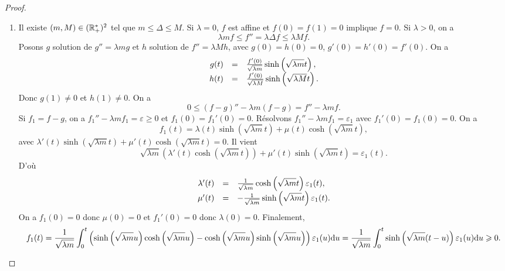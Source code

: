 \documentclass[12pt]{article}
\begin{document}
\begin{proof}
	\phantom{}
	\begin{enumerate}
		\item Il existe $(m,M)\in(\mathbb{R}_{+}^{*})^{2}$ tel que $m\leqslant \Delta\leqslant M$. Si $\lambda=0$, $f$ est affine et $f(0)=f(1)=0$ implique $f=0$. Si $\lambda>0$, on a 
		\begin{equation}
			\lambda mf\leqslant f''=\lambda\Delta f\leqslant \lambda Mf.
		\end{equation}
		Posons $g$ solution de $g''=\lambda mg$ et $h$ solution de $f''=\lambda Mh$, avec $g(0)=h(0)=0$, $g'(0)=h'(0)=f'(0)$. On a 
		\begin{equation}
			\begin{array}[]{rcl}
				g(t) &=& \frac{f'(0)}{\sqrt{\lambda m}}\sinh\left(\sqrt{\lambda m}t\right),\\
				h(t) &=& \frac{f'(0)}{\sqrt{\lambda M}}\sinh\left(\sqrt{\lambda M}t\right).
			\end{array}
		\end{equation}
		Donc $g(1)\neq0$ et $h(1)\neq0$. On a 
		\begin{equation}
			0\leqslant (f-g)''-\lambda m(f-g)=f''-\lambda mf.
		\end{equation}
		Si $f_1=f-g$, on a $f_1''-\lambda m f_1=\varepsilon\geqslant0$ et $f_1(0)=f_1'(0)=0$. Résolvons $f_1''-\lambda mf_1=\varepsilon_{1}$ avec $f_1'(0)=f_1(0)=0$. On a 
		\begin{equation}
			f_1(t) = \lambda(t)\sinh\left(\sqrt{\lambda m}t\right)+\mu(t)\cosh\left(\sqrt{\lambda m}t\right),
		\end{equation}
		avec $\lambda'(t)\sinh\left(\sqrt{\lambda m}t\right)+\mu'(t)\cosh\left(\sqrt{\lambda m}t\right)=0$. Il vient 
		\begin{equation}
			\sqrt{\lambda m}\left(\lambda'(t)\cosh\left(\sqrt{\lambda m}t\right)\right)+\mu'(t)\sinh\left(\sqrt{\lambda m}t\right)=\varepsilon_{1}(t).
		\end{equation}
		D'où 
		\begin{equation}
			\begin{array}[]{rcl}
				\lambda'(t) &=& \frac{1}{\sqrt{\lambda m}}\cosh\left(\sqrt{\lambda m}t\right)\varepsilon_{1}(t),\\
				\mu'(t) &=& -\frac{1}{\sqrt{\lambda m}}\sinh\left(\sqrt{\lambda m}t\right)\varepsilon_{1}(t).
			\end{array}
		\end{equation}
		On a $f_1(0)=0$ donc $\mu(0)=0$ et $f_1'(0)=0$ donc $\lambda(0)=0$. Finalement,
		\begin{equation}
			f_1(t)=\frac{1}{\sqrt{\lambda m}}\int_{0}^{t}\left(\sinh\left(\sqrt{\lambda m}u\right)\cosh\left(\sqrt{\lambda m}u\right)-\cosh\left(\sqrt{\lambda m}u\right)\sinh\left(\sqrt{\lambda m}u\right)\right)\varepsilon_{1}(u)\mathrm{d} u=\frac{1}{\sqrt{\lambda m}}\int_{0}^{t}\sinh\left(\sqrt{\lambda m}(t-u)\right)\varepsilon_{1}(u)\mathrm{d} u\geqslant0.
		\end{equation}


\end{enumerate}
\end{proof}
\end{document}
